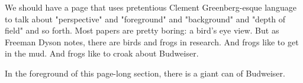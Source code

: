 We should have a page that uses pretentious Clement Greenberg-esque language to talk about "perspective" and "foreground" and "background" and "depth of field" and so forth. Most papers are pretty boring: a bird's eye view. But as Freeman Dyson notes, there are birds and frogs in research. And frogs like to get in the mud. And frogs like to croak about Budweiser.

In the foreground of this page-long section, there is a giant can of Budweiser.